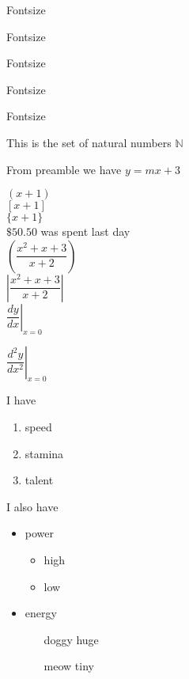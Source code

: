 \documentclass[12pt]{article}  %
\def\EquationRepeat{y = mx + 3}   %
\begin{document}
\begin{center}
\begin{tiny}
Fontsize\\
\end{tiny}
\begin{small}
Fontsize\\
\end{small}
\begin{normalsize}
Fontsize\\
\end{normalsize}
\begin{Large}
Fontsize\\
\end{Large}
\begin{Huge}
Fontsize\\
\end{Huge}
\end{center}

This is the set of natural numbers $\mathbb{N}$

From preamble we have $\EquationRepeat$
\begin{center}
$(x+1)$ \\
$[x+1] $\\
$\{x+1\}$ \\
$\$50.50 $ was spent last day \\
$\left(\dfrac{x^2+x+3}{x+2}\right)$ \\
$\left|\dfrac{x^2+x+3}{x+2}\right|$\\
$
\left.\dfrac{dy}{dx}\right|_{x=0}
$
\end{center}


\begin{center}
$
\left.\dfrac{d^{2}y}{dx^{2}}\right|_{x=0}
$
\end{center}

I have

\begin{enumerate}
\item speed
\item stamina
\item talent
\end{enumerate}

I also have

\begin{itemize}
\item power
	\begin{itemize}
	\item high
	\item low
	\end{itemize}
\item energy
	\begin{itemize}
	\item[doggy] huge
	\item[meow]  tiny
\end{itemize}
\end{itemize}
\end{document}
